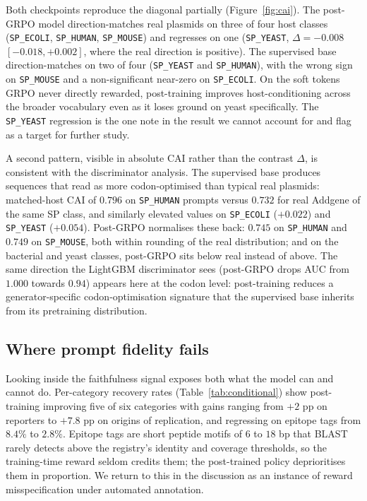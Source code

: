 \documentclass{article}
\begin{document}
Both checkpoints reproduce the diagonal partially (Figure~\ref{fig:cai}). The post-GRPO
model direction-matches real plasmids on three of four host classes (\texttt{SP\_ECOLI},
\texttt{SP\_HUMAN}, \texttt{SP\_MOUSE}) and regresses on one (\texttt{SP\_YEAST},
$\Delta = -0.008$ $[-0.018, +0.002]$, where the real direction is positive). The
supervised base direction-matches on two of four (\texttt{SP\_YEAST} and
\texttt{SP\_HUMAN}), with the wrong sign on \texttt{SP\_MOUSE} and a non-significant
near-zero on \texttt{SP\_ECOLI}. On the soft tokens GRPO never directly rewarded,
post-training improves host-conditioning across the broader vocabulary even as it loses
ground on yeast specifically. The \texttt{SP\_YEAST} regression is the one note in the
result we cannot account for and flag as a target for further study.

A second pattern, visible in absolute CAI rather than the contrast $\Delta$, is
consistent with the discriminator analysis. The supervised base produces sequences that
read as more codon-optimised than typical real plasmids: matched-host CAI of $0.796$ on
\texttt{SP\_HUMAN} prompts versus $0.732$ for real Addgene of the same SP class, and
similarly elevated values on \texttt{SP\_ECOLI} ($+0.022$) and \texttt{SP\_YEAST}
($+0.054$). Post-GRPO normalises these back: $0.745$ on \texttt{SP\_HUMAN} and
$0.749$ on \texttt{SP\_MOUSE}, both within rounding of the real distribution; and on
the bacterial and yeast classes, post-GRPO sits below real instead of above. The same
direction the LightGBM discriminator sees (post-GRPO drops AUC from $1.000$ towards
$0.94$) appears here at the codon level: post-training reduces a generator-specific
codon-optimisation signature that the supervised base inherits from its pretraining
distribution.

\subsection{Where prompt fidelity fails}
\label{sec:prompt-fid}

Looking inside the faithfulness signal exposes both what the model can and cannot do.
Per-category recovery rates (Table~\ref{tab:conditional}) show post-training improving
five of six categories with gains ranging from $+2$ pp on reporters to $+7.8$ pp on
origins of replication, and regressing on epitope tags from $8.4\%$ to $2.8\%$. Epitope
tags are short peptide motifs of $6$ to $18$ bp that BLAST rarely detects above the
registry's identity and coverage thresholds, so the training-time reward seldom credits
them; the post-trained policy deprioritises them in proportion. We return to this in the
discussion as an instance of reward misspecification under automated annotation.
\end{document}
